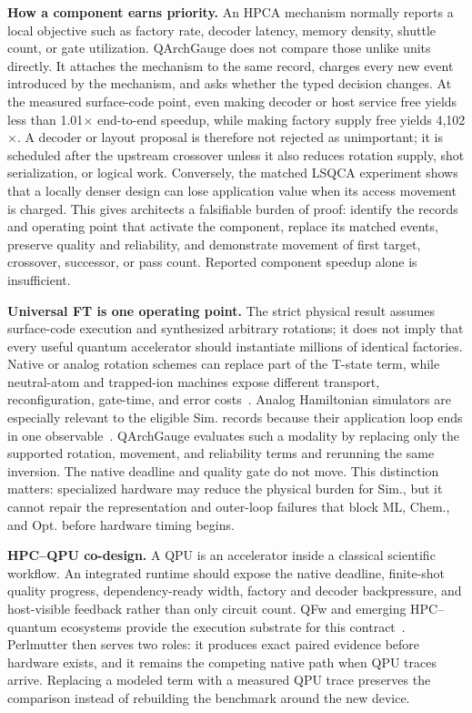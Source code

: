 \noindent\textbf{How a component earns priority.}
An HPCA mechanism normally reports a local objective such as factory rate, decoder latency, memory density, shuttle count, or gate utilization. QArchGauge does not compare those unlike units directly. It attaches the mechanism to the same record, charges every new event introduced by the mechanism, and asks whether the typed decision changes. At the measured surface-code point, even making decoder or host service free yields less than 1.01$\times$ end-to-end speedup, while making factory supply free yields 4,102$\times$. A decoder or layout proposal is therefore not rejected as unimportant; it is scheduled after the upstream crossover unless it also reduces rotation supply, shot serialization, or logical work. Conversely, the matched LSQCA experiment shows that a locally denser design can lose application value when its access movement is charged. This gives architects a falsifiable burden of proof: identify the records and operating point that activate the component, replace its matched events, preserve quality and reliability, and demonstrate movement of first target, crossover, successor, or pass count. Reported component speedup alone is insufficient.

\noindent\textbf{Universal FT is one operating point.}
The strict physical result assumes surface-code execution and synthesized arbitrary rotations; it does not imply that every useful quantum accelerator should instantiate millions of identical factories. Native or analog rotation schemes can replace part of the T-state term, while neutral-atom and trapped-ion machines expose different transport, reconfiguration, gate-time, and error costs~\cite{bluvstein2024logical,bluvstein2026faulttolerant,pino2021qccd,toshio2026starmagic}. Analog Hamiltonian simulators are especially relevant to the eligible Sim. records because their application loop ends in one observable~\cite{georgescu2014quantum,daley2022practical}. QArchGauge evaluates such a modality by replacing only the supported rotation, movement, and reliability terms and rerunning the same inversion. The native deadline and quality gate do not move. This distinction matters: specialized hardware may reduce the physical burden for Sim., but it cannot repair the representation and outer-loop failures that block ML, Chem., and Opt. before hardware timing begins.

\noindent\textbf{HPC--QPU co-design.}
A QPU is an accelerator inside a classical scientific workflow. An integrated runtime should expose the native deadline, finite-shot quality progress, dependency-ready width, factory and decoder backpressure, and host-visible feedback rather than only circuit count. QFw and emerging HPC--quantum ecosystems provide the execution substrate for this contract~\cite{qfw2025,qfwsc25,ornlhpcecosystem2024,nerscquantumroadmap2025}. Perlmutter then serves two roles: it produces exact paired evidence before hardware exists, and it remains the competing native path when QPU traces arrive. Replacing a modeled term with a measured QPU trace preserves the comparison instead of rebuilding the benchmark around the new device.

